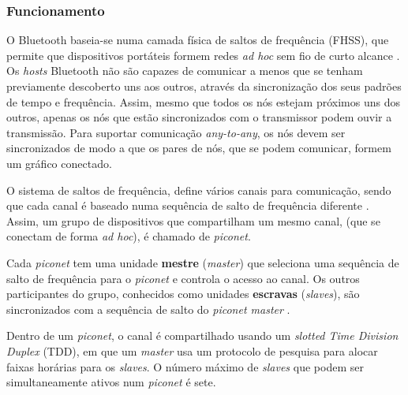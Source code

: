 \documentclass[conference]{IEEEtran}
\begin{document}
\subsubsection{Funcionamento}



O Bluetooth baseia-se numa camada física de saltos de frequência (FHSS), que permite que dispositivos portáteis formem redes \textit{ad hoc} sem fio de curto alcance \cite{salonidis2005distributed}. 
Os \textit{hosts} Bluetooth não são capazes de comunicar a menos que se tenham previamente descoberto uns aos outros, através da sincronização dos seus padrões de tempo e frequência. 
Assim, mesmo que todos os nós estejam próximos uns dos outros, apenas os nós que estão sincronizados com o transmissor podem ouvir a transmissão.
Para suportar comunicação \textit{any-to-any}, os nós devem ser sincronizados de modo a que os pares de nós, que se podem comunicar, formem um gráfico conectado.

O sistema de saltos de frequência, define vários canais para comunicação, sendo que cada canal é baseado numa sequência de salto de frequência diferente \cite{salonidis2005distributed}. 
Assim, um grupo de dispositivos que compartilham um mesmo canal, (que se conectam de forma \textit{ad hoc}), é chamado de \textit{piconet}. 

Cada \textit{piconet} tem uma unidade \textbf{mestre} (\textit{master}) que seleciona uma sequência de salto de frequência para o \textit{piconet} e controla o acesso ao canal. 
Os outros participantes do grupo, conhecidos como unidades \textbf{escravas} (\textit{slaves}), são sincronizados com a sequência de salto do \textit{piconet master} \cite{salonidis2005distributed}. 

Dentro de um \textit{piconet}, o canal é compartilhado usando um \textit{slotted Time Division Duplex} (TDD), em que um \textit{master} usa um protocolo de pesquisa para alocar faixas horárias para os \textit{slaves}. O número máximo de \textit{slaves} que podem ser simultaneamente ativos num \textit{piconet} é sete.
\end{document}
